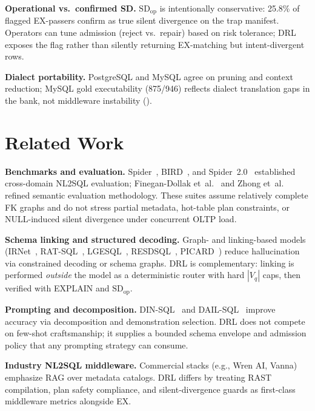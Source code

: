 \documentclass[twocolumn]{svjour3}
\begin{document}
\textbf{Operational vs.\ confirmed SD.}
$\text{SD}_{\text{op}}$ is intentionally conservative: 25.8\% of flagged EX-passers confirm as true silent divergence on the trap manifest.
Operators can tune admission (reject vs.\ repair) based on risk tolerance; DRL exposes the flag rather than silently returning EX-matching but intent-divergent rows.

\textbf{Dialect portability.}
PostgreSQL and MySQL agree on pruning and context reduction; MySQL gold executability (875/946) reflects dialect translation gaps in the bank, not middleware instability ().

\section{Related Work}
\label{sec:related}

\textbf{Benchmarks and evaluation.}
Spider~\cite{yu2018spider}, BIRD~\cite{li2023can}, and Spider~2.0~\cite{lei2024spider2} established cross-domain NL2SQL evaluation; Finegan-Dollak et~al.~\cite{finegan2018improving} and Zhong et~al.~\cite{zhong2020semantic} refined semantic evaluation methodology.
These suites assume relatively complete FK graphs and do not stress partial metadata, hot-table plan constraints, or NULL-induced silent divergence under concurrent OLTP load.

\textbf{Schema linking and structured decoding.}
Graph- and linking-based models (IRNet~\cite{guo2019irnet}, RAT-SQL~\cite{wang2020ratsql}, LGESQL~\cite{cao2021lgesql}, RESDSQL~\cite{li2023resdsql}, PICARD~\cite{scholak2021picard}) reduce hallucination via constrained decoding or schema graphs.
DRL is complementary: linking is performed \emph{outside} the model as a deterministic router with hard $|V_q|$ caps, then verified with EXPLAIN and $\text{SD}_{\text{op}}$.

\textbf{Prompting and decomposition.}
DIN-SQL~\cite{pourreza2023dinsql} and DAIL-SQL~\cite{gao2023dail} improve accuracy via decomposition and demonstration selection.
DRL does not compete on few-shot craftsmanship; it supplies a bounded schema envelope and admission policy that any prompting strategy can consume.

\textbf{Industry NL2SQL middleware.}
Commercial stacks (e.g., Wren AI, Vanna) emphasize RAG over metadata catalogs.
DRL differs by treating RAST compilation, plan safety compliance, and silent-divergence guards as first-class middleware metrics alongside EX.
\end{document}
